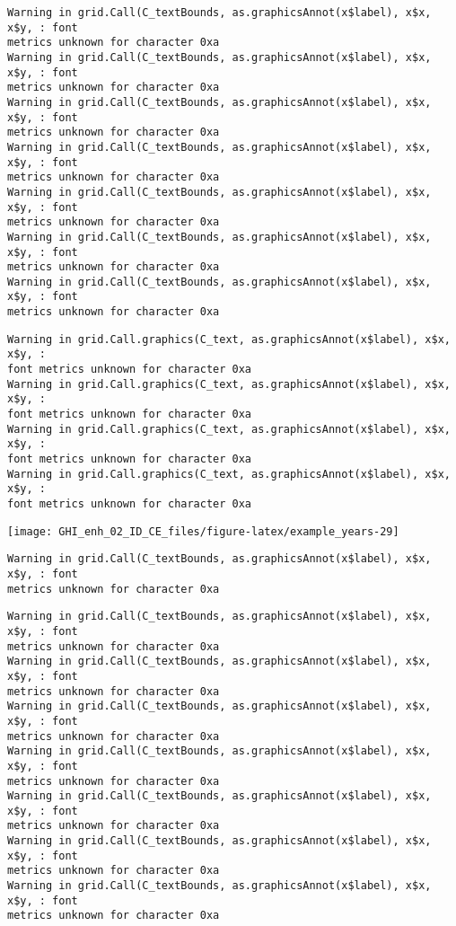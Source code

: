 \documentclass[
  10pt,
  a4paper,oneside]{article}
\begin{document}
\begin{verbatim}
Warning in grid.Call(C_textBounds, as.graphicsAnnot(x$label), x$x, x$y, : font
metrics unknown for character 0xa
Warning in grid.Call(C_textBounds, as.graphicsAnnot(x$label), x$x, x$y, : font
metrics unknown for character 0xa
Warning in grid.Call(C_textBounds, as.graphicsAnnot(x$label), x$x, x$y, : font
metrics unknown for character 0xa
Warning in grid.Call(C_textBounds, as.graphicsAnnot(x$label), x$x, x$y, : font
metrics unknown for character 0xa
Warning in grid.Call(C_textBounds, as.graphicsAnnot(x$label), x$x, x$y, : font
metrics unknown for character 0xa
Warning in grid.Call(C_textBounds, as.graphicsAnnot(x$label), x$x, x$y, : font
metrics unknown for character 0xa
Warning in grid.Call(C_textBounds, as.graphicsAnnot(x$label), x$x, x$y, : font
metrics unknown for character 0xa
\end{verbatim}

\begin{verbatim}
Warning in grid.Call.graphics(C_text, as.graphicsAnnot(x$label), x$x, x$y, :
font metrics unknown for character 0xa
Warning in grid.Call.graphics(C_text, as.graphicsAnnot(x$label), x$x, x$y, :
font metrics unknown for character 0xa
Warning in grid.Call.graphics(C_text, as.graphicsAnnot(x$label), x$x, x$y, :
font metrics unknown for character 0xa
Warning in grid.Call.graphics(C_text, as.graphicsAnnot(x$label), x$x, x$y, :
font metrics unknown for character 0xa
\end{verbatim}

\begin{center}\texttt{[image: GHI\_enh\_02\_ID\_CE\_files/figure-latex/example\_years-29]} \end{center}

\begin{verbatim}
Warning in grid.Call(C_textBounds, as.graphicsAnnot(x$label), x$x, x$y, : font
metrics unknown for character 0xa
\end{verbatim}

\begin{verbatim}
Warning in grid.Call(C_textBounds, as.graphicsAnnot(x$label), x$x, x$y, : font
metrics unknown for character 0xa
Warning in grid.Call(C_textBounds, as.graphicsAnnot(x$label), x$x, x$y, : font
metrics unknown for character 0xa
Warning in grid.Call(C_textBounds, as.graphicsAnnot(x$label), x$x, x$y, : font
metrics unknown for character 0xa
Warning in grid.Call(C_textBounds, as.graphicsAnnot(x$label), x$x, x$y, : font
metrics unknown for character 0xa
Warning in grid.Call(C_textBounds, as.graphicsAnnot(x$label), x$x, x$y, : font
metrics unknown for character 0xa
Warning in grid.Call(C_textBounds, as.graphicsAnnot(x$label), x$x, x$y, : font
metrics unknown for character 0xa
Warning in grid.Call(C_textBounds, as.graphicsAnnot(x$label), x$x, x$y, : font
metrics unknown for character 0xa
\end{verbatim}
\end{document}
